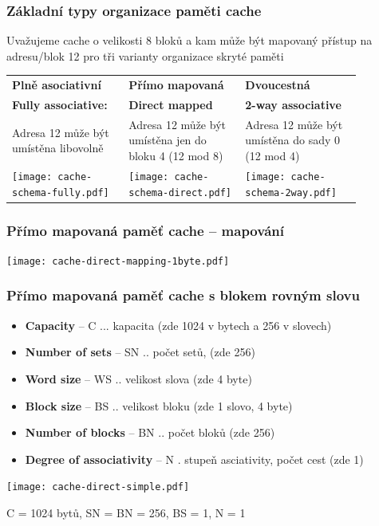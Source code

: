 \documentclass{beamer}
\begin{document}
\begin{frame}
\frametitle{Základní typy organizace paměti cache}

Uvažujeme cache o velikosti 8 bloků a kam může být mapovaný přístup na adresu/blok 12 pro tři varianty organizace skryté paměti

\begin{tabular}{p{0.29\linewidth}p{0.29\linewidth}p{0.29\linewidth}}
\textbf{Plně asociativní} & \textbf{Přímo mapovaná} & \textbf{Dvoucestná} \\
\textbf{Fully associative:} & \textbf{Direct mapped} & \textbf{2-way associative} \\
Adresa 12 může být umístěna libovolně &
Adresa 12 může být umístěna jen do bloku 4 (12 mod 8) &
Adresa 12 může být umístěna do sady 0 (12 mod 4) \\
\texttt{[image: cache-schema-fully.pdf]} &
\texttt{[image: cache-schema-direct.pdf]} &
\texttt{[image: cache-schema-2way.pdf]} \\
\end{tabular}

\end{frame}

\begin{frame}
\frametitle{Přímo mapovaná paměť cache -- mapování}

{
\centering

\texttt{[image: cache-direct-mapping-1byte.pdf]}

}

\end{frame}

\begin{frame}
\frametitle{Přímo mapovaná paměť cache s blokem rovným slovu}

\begin{itemize}
\item \textbf{Capacity} -- C ... kapacita (zde 1024 v bytech a 256 v slovech)
\item \textbf{Number of sets} -- SN .. počet setů, (zde 256)
\item \textbf{Word size} – WS .. velikost slova (zde 4 byte)
\item \textbf{Block size} – BS .. velikost bloku (zde 1 slovo, 4 byte)
\item \textbf{Number of blocks} -- BN .. počet bloků (zde 256)
\item \textbf{Degree of associativity} -- N . stupeň asciativity, počet cest (zde 1)
\end{itemize}

{
\centering

\texttt{[image: cache-direct-simple.pdf]}

}

C = 1024 bytů, SN = BN = 256, BS = 1, N = 1

\end{frame}
\end{document}
